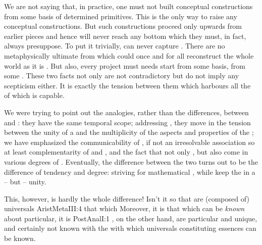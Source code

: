 We are not saying that, in practice, one must not built conceptual constructions
from some basis of determined primitives. This is the only way to raise any
conceptual constructions.  But such constructions proceed only upwards from
earlier  pieces and hence will never reach any bottom which they
must, in fact, always presuppose. To put it trivially,  can never
capture .  There are no metaphysically
ultimate  from which  could once and for all
reconstruct the whole world as it is . But also, every
 project must needs start from some basis, from some
. These two facts not only are not contradictory but do not imply
any scepticism either. It is exactly the tension between them which harbours all
the  of which  is capable.

%
We were trying to point out the analogies, rather than the differences, between
 and : they have the same temporal scope; addressing
, they move in the tension between the unity of a  and
the multiplicity of the aspects and properties of the ; we have
emphasized the communicability of , if not an irresolvable association
so at least complementarity of  and , and the fact that
not only , but also  come in various degrees of
. Eventually, the difference between the two turns out to be the
difference of tendency and degree:   striving for
mathematical , while  keep the  in a
 -- but  -- unity.

This, however, is hardly the whole difference!  Isn't it so that 
are (composed of) universals \citet{and by the universal we mean that which is
  predicable of the individuals,}{AristMeta}{III:4} that which  Moreover, it is that which can be {\em known}
about particular, it is \citet{implicit in the clearly known
  particular.}{PostAnal}{I:1} , on the other hand, are
particular and unique, and certainly not known with the  with
which universals constituting essences can be known.

